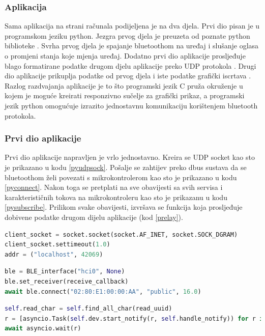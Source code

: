 \documentclass[times, utf8, diplomski]{diplomski}
\begin{document}
\subsubsection{Aplikacija}
Sama aplikacija na strani računala podijeljena je na dva djela. Prvi dio pisan je u programskom jeziku python. Jezgra prvog djela je preuzeta od poznate python biblioteke \cite{ble-serial}. Svrha prvog djela je spajanje bluetoothom na uređaj i slušanje oglasa o promjeni stanja koje mjenja uređaj. Dodatno prvi dio aplikacije prosljeđuje blago formatirane podatke drugom djelu aplikacije preko UDP protokola \cite{firstPart}. Drugi dio aplikacije prikuplja podatke od prvog djela i iste podatke grafički iscrtava \cite{secondPart}. Razlog razdvajanja aplikacije je to što programski jezik C pruža okruženje u kojem je moguće kreirati responzivno sučelje za grafički prikaz, a programski jezik python omogućuje izrazito jednostavnu komunikaciju korištenjem bluetooth protokola.

\subsubsection{Prvi dio aplikacije}
Prvi dio aplikacije napravljen je vrlo jednostavno. Kreira se UDP socket kao sto je prikazano u kodu \ref{pyudpsock}. Pošalje se zahtijev preko dbus sustava da se bluetoothom želi povezati s mikrokontrolerom kao sto je prikazano u kodu \ref{pyconnect}. Nakon toga se pretplati na sve obavijesti sa svih servisa i karakterističnih tokova na mikrokontroleru kao sto je prikazanu u kodu \ref{pysubscribe}. Prilikom svake obavijesti, izvršava se funkcija koja prosljeđuje dobivene podatke drugom dijelu aplikacije (kod \ref{prelay}).

\begin{lstlisting}[language=python, caption={Kreiranje udp socketa u pythonu}, label={pyudpsock}]
client_socket = socket.socket(socket.AF_INET, socket.SOCK_DGRAM)
client_socket.settimeout(1.0)
addr = ("localhost", 42069)
\end{lstlisting}

\begin{lstlisting}[language=python, caption={Spajanje bluetoothom na microkontroler}, label={pyconnect}]
ble = BLE_interface("hci0", None)
ble.set_receiver(receive_callback)
await ble.connect("02:80:E1:00:00:AA", "public", 16.0)
\end{lstlisting}

\begin{lstlisting}[language=python, caption={Pretplaćivanje na sve obavijesti sa svih servisa i karakterističnih tokov na microkontroleru}, label={pysubscribe}]
self.read_char = self.find_all_char(read_uuid)
r = [asyncio.Task(self.dev.start_notify(r, self.handle_notify)) for r in self.read_char]
await asyncio.wait(r)
\end{lstlisting}
\end{document}
